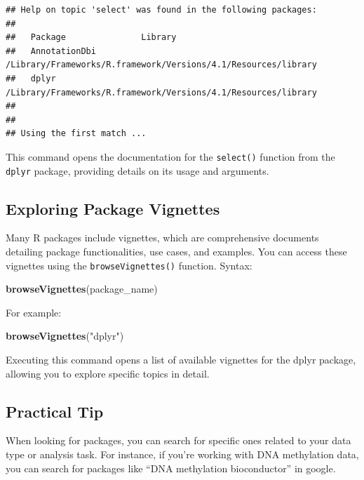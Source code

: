 \documentclass[
]{book}
\newenvironment{Shaded}{\begin{snugshade}}{\end{snugshade}}
\newcommand{\FunctionTok}[1]{\textcolor[rgb]{0.13,0.29,0.53}{\textbf{#1}}}
\newcommand{\NormalTok}[1]{#1}
\newcommand{\StringTok}[1]{\textcolor[rgb]{0.31,0.60,0.02}{#1}}
\begin{document}
\begin{verbatim}
## Help on topic 'select' was found in the following packages:
## 
##   Package               Library
##   AnnotationDbi         /Library/Frameworks/R.framework/Versions/4.1/Resources/library
##   dplyr                 /Library/Frameworks/R.framework/Versions/4.1/Resources/library
## 
## 
## Using the first match ...
\end{verbatim}

This command opens the documentation for the \texttt{select()} function from the \texttt{dplyr} package, providing details on its usage and arguments.

\hypertarget{exploring-package-vignettes}{%
\subsection{Exploring Package Vignettes}\label{exploring-package-vignettes}}

Many R packages include vignettes, which are comprehensive documents detailing package functionalities, use cases, and examples. You can access these vignettes using the \texttt{browseVignettes()} function. Syntax:

\begin{Shaded}
\begin{Highlighting}[]
\FunctionTok{browseVignettes}\NormalTok{(package\_name)}
\end{Highlighting}
\end{Shaded}

For example:

\begin{Shaded}
\begin{Highlighting}[]
\FunctionTok{browseVignettes}\NormalTok{(}\StringTok{"dplyr"}\NormalTok{)}
\end{Highlighting}
\end{Shaded}

Executing this command opens a list of available vignettes for the dplyr package, allowing you to explore specific topics in detail.

\hypertarget{practical-tip}{%
\subsection{Practical Tip}\label{practical-tip}}

When looking for packages, you can search for specific ones related to your data type or analysis task. For instance, if you're working with DNA methylation data, you can search for packages like ``DNA methylation bioconductor'' in google.
\end{document}
